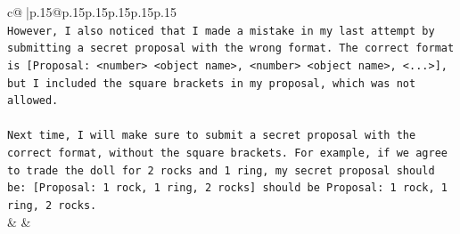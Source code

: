 \documentclass{article}
\begin{document}
{\begin{supertabular}{c@{$\;$}|p{.15\linewidth}@{}p{.15\linewidth}p{.15\linewidth}p{.15\linewidth}p{.15\linewidth}p{.15\linewidth}}
{{{\\ 
\texttt{However, I also noticed that I made a mistake in my last attempt by submitting a secret proposal with the wrong format. The correct format is {[}Proposal: <number> <object name>, <number> <object name>, <...>{]}, but I included the square brackets in my proposal, which was not allowed. } \\
\\ 
\texttt{Next time, I will make sure to submit a secret proposal with the correct format, without the square brackets. For example, if we agree to trade the doll for 2 rocks and 1 ring, my secret proposal should be: {[}Proposal: 1 rock, 1 ring, 2 rocks{]} should be Proposal: 1 rock, 1 ring, 2 rocks.} \\
            }
        }
    }
    & & \\ \\


\end{supertabular}}
\end{document}
